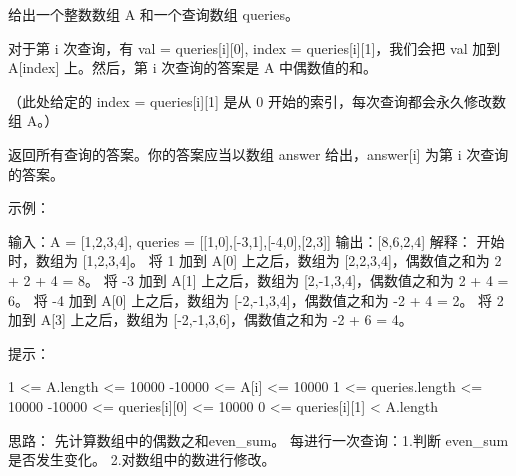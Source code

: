 给出一个整数数组 A 和一个查询数组 queries。

对于第 i 次查询，有 val = queries[i][0], index = queries[i][1]，我们会把 val 加到 A[index] 上。然后，第 i 次查询的答案是 A 中偶数值的和。

（此处给定的 index = queries[i][1] 是从 0 开始的索引，每次查询都会永久修改数组 A。）

返回所有查询的答案。你的答案应当以数组 answer 给出，answer[i] 为第 i 次查询的答案。

 

示例：

输入：A = [1,2,3,4], queries = [[1,0],[-3,1],[-4,0],[2,3]]
输出：[8,6,2,4]
解释：
开始时，数组为 [1,2,3,4]。
将 1 加到 A[0] 上之后，数组为 [2,2,3,4]，偶数值之和为 2 + 2 + 4 = 8。
将 -3 加到 A[1] 上之后，数组为 [2,-1,3,4]，偶数值之和为 2 + 4 = 6。
将 -4 加到 A[0] 上之后，数组为 [-2,-1,3,4]，偶数值之和为 -2 + 4 = 2。
将 2 加到 A[3] 上之后，数组为 [-2,-1,3,6]，偶数值之和为 -2 + 6 = 4。

 

提示：

    1 <= A.length <= 10000
    -10000 <= A[i] <= 10000
    1 <= queries.length <= 10000
    -10000 <= queries[i][0] <= 10000
    0 <= queries[i][1] < A.length























思路：
先计算数组中的偶数之和even_sum。
每进行一次查询：1.判断 even_sum 是否发生变化。   2.对数组中的数进行修改。

























